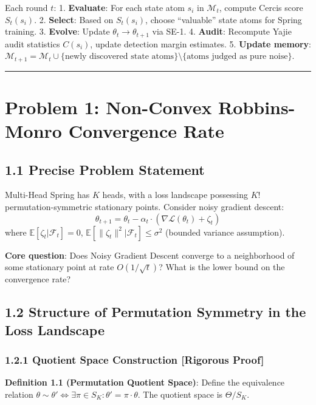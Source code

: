 \documentclass[
  12pt,
]{article}
\begin{document}
Each round $t$:
1. \textbf{Evaluate}: For each state atom $s_i$ in $\mathcal{M}_t$, compute Cercis score $S_t(s_i)$.
2. \textbf{Select}: Based on $S_t(s_i)$, choose ``valuable'' state atoms for Spring training.
3. \textbf{Evolve}: Update $\theta_t \to \theta_{t+1}$ via SE-1.
4. \textbf{Audit}: Recompute Yajie audit statistics $C(s_i)$, update detection margin estimates.
5. \textbf{Update memory}: $\mathcal{M}_{t+1} = \mathcal{M}_t \cup \{\text{newly discovered state atoms}\} \setminus \{\text{atoms judged as pure noise}\}$.

\begin{center}\rule{0.5\linewidth}{0.5pt}\end{center}

\section{Problem 1: Non-Convex Robbins-Monro Convergence Rate}\label{problem-1-nonconvex-convergence}

\subsection{1.1 Precise Problem Statement}\label{precise-problem-statement}

Multi-Head Spring has $K$ heads, with a loss landscape possessing $K!$ permutation-symmetric stationary points. Consider noisy gradient descent:
\[\theta_{t+1} = \theta_t - \alpha_t \cdot (\nabla \mathcal{L}(\theta_t) + \zeta_t)\]
where $\mathbb{E}[\zeta_t | \mathcal{F}_t] = 0$, $\mathbb{E}[\|\zeta_t\|^2 | \mathcal{F}_t] \leq \sigma^2$ (bounded variance assumption).

\textbf{Core question}: Does Noisy Gradient Descent converge to a neighborhood of some stationary point at rate $O(1/\sqrt{t})$? What is the lower bound on the convergence rate?

\subsection{1.2 Structure of Permutation Symmetry in the Loss Landscape}\label{permutation-symmetry-structure}

\subsubsection{1.2.1 Quotient Space Construction [Rigorous Proof]}\label{quotient-space-construction}

\textbf{Definition 1.1 (Permutation Quotient Space)}: Define the equivalence relation $\theta \sim \theta' \iff \exists \pi \in S_K : \theta' = \pi \cdot \theta$. The quotient space is $\Theta / S_K$.
\end{document}

